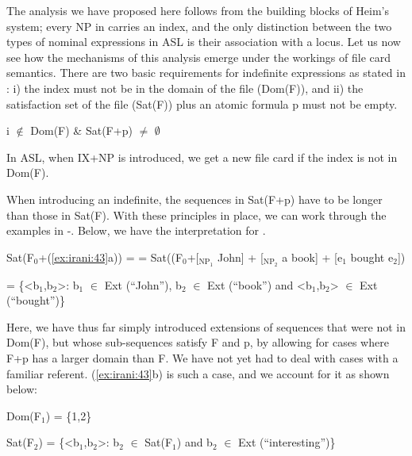 \documentclass[output=paper,
modfonts
]{langscibook}
\begin{document}
The analysis we have proposed here follows from the building blocks of Heim's system; every NP in  carries an index, and the only distinction between the two types of nominal expressions in ASL is their association with a locus. Let us now see how the mechanisms of this analysis emerge under the workings of file card semantics. There are two basic requirements for indefinite expressions as stated in : i) the index must not be in the domain of the file (Dom(F)), and ii) the satisfaction set of the file (Sat(F)) plus an atomic formula p must not be empty. 

\begin{exe}
\ex \label{ex:irani:47} i \(\notin\) Dom(F) \& Sat(F+p) \(\neq\) \(\emptyset\)
\end{exe}

In ASL, when IX+NP is introduced, we get a new file card if the index is not in Dom(F). 

When introducing an indefinite, the sequences in Sat(F+p) have to be longer than those in Sat(F). With these principles in place, we can work through the examples in -. Below, we have the interpretation for .

\begin{exe}

\ex Sat(F$_0$+(\ref{ex:irani:43}a)) =
= Sat((F$_0$+[$_{\text{NP}_{1}}$ John] + [$_{\text{NP}_{2}}$ a book] + [e$_1$ bought e$_2$])\par 
= \{<b$_1$,b$_2$>: b$_1$ \(\in\) Ext (``John''), b$_2$ \(\in\) Ext (``book'') and <b$_1$,b$_2$> \(\in\) Ext (``bought'')\} \par 

\end{exe}

Here, we have thus far simply introduced extensions of sequences that were not in Dom(F), but whose sub-sequences satisfy F and p, by allowing for cases where F+p has a larger domain than F. We have not yet had to deal with cases with a familiar referent. (\ref{ex:irani:43}b) is such a case, and we account for it as shown below: 

\begin{exe}

\ex Dom(F$_1$) = \{1,2\} \par 
Sat(F$_2$) = \{<b$_1$,b$_2$>: b$_2$ \(\in\) Sat(F$_1$) and b$_2$ \(\in\) Ext (``interesting'')\} \par 

\end{exe}
\end{document}
